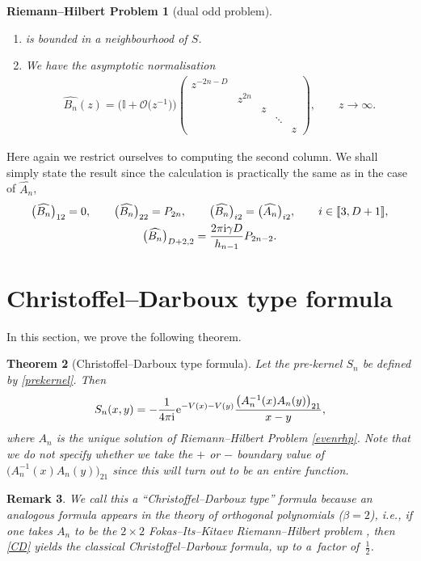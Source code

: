 \documentclass[pdftex]{sigma}
\numberwithin{equation}{section}
\newtheorem{Theorem}{Theorem}[section]
\newtheorem{rhp}[Theorem]{Riemann--Hilbert Problem}
\newtheorem{Remark}[Theorem]{Remark}
\begin{document}
\begin{rhp}[dual odd problem]
\begin{enumerate}
\begin{align*}
\begin{array}{ccccccccccccccccccc}
- \mathit{X}^{-2n-D} \chi_{\mathbb{T}} & & & & & & & & 1 \\
\end{array} \right),\qquad x \in \Sigma \setminus S.
\end{align*}
\item[$(3)$]  is bounded in a neighbourhood of $S$.
\item[$(4)$] We have the asymptotic normalisation
\begin{align*}
\widehat{B_{n}}(z) = \big(\mathbb{I}+ \mathcal{O}\big(z^{-1}\big)\big) \left(\begin{matrix}
z^{-2n-D} \\
& z^{2n} \\
& & z \\
& & & \ddots \\
& & & & z
\end{matrix} \right), \qquad z \to \infty.
\end{align*}
\end{enumerate}
\end{rhp}
Here again we restrict ourselves to computing the second column. We shall simply state the result since the calculation is practically the same as in the case of $\widehat{A_n}$,
\begin{gather*}
\big(\widehat{B_n}\big)_{12} = 0 ,\qquad
\big(\widehat{B_n}\big)_{22} = P_{2n},\qquad
\big(\widehat{B_n}\big)_{i2} = \big(\widehat{A_n}\big)_{i2},\qquad i \in [\![3, D+1]\!] ,\\
\big(\widehat{B_n}\big)_{D+2,2} = \frac{2\pi {\rm i} \gamma D}{h_{n-1}} P_{2n-2}.
\end{gather*}

\section{Christoffel--Darboux type formula}\label{christoffelsection}

In this section, we prove the following theorem.
\begin{Theorem}[Christoffel--Darboux type formula]
Let the pre-kernel $S_n$ be defined by \eqref{prekernel}. Then
\begin{equation}\label{CD}
S_n(x,y) = -\frac{1}{4\pi {\rm i}} {\rm e}^{-V(x)-V(y)} \frac{\big( A_n^{-1}(x) A_n(y) \big)_{21}}{x-y},
\end{equation}
where $A_n$ is the unique solution of Riemann--Hilbert Problem {\rm\ref{evenrhp}}. Note that we do not specify whether we take the $+$ or $-$ boundary value of $\big( A_n^{-1}(x) A_n(y) \big)_{21}$ since this will turn out to be an entire function.
\end{Theorem}
\begin{Remark} We call this a \enquote{Christoffel--Darboux type} formula because an analogous formula appears in the theory of orthogonal polynomials ($\beta = 2$), i.e., if one takes $A_n$ to be the ${2\times 2}$ Fokas--Its--Kitaev Riemann--Hilbert problem \cite{fokas}, then \eqref{CD} yields the classical Christoffel--Darboux formula, up to a~factor of~$\frac{1}{2}$.
\end{Remark}
\end{document}
